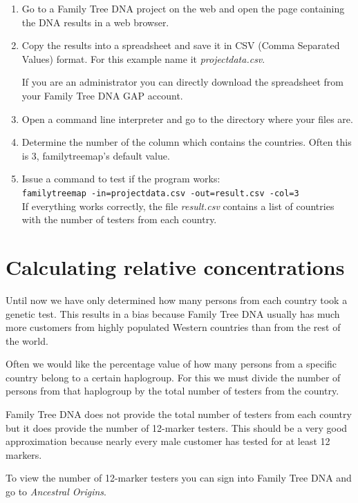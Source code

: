 \documentclass[12pt,a4paper]{article}
\begin{document}
\begin{enumerate}
\item Go to a Family Tree DNA project on the web and open the
  page containing the DNA results in a web browser.
\item Copy the results into a spreadsheet and save it in
  CSV (Comma Separated Values) format. For this example
  name it \emph{projectdata.csv}.

  If you are an administrator you can directly download the
  spreadsheet from your Family Tree DNA GAP account.

\item Open a command line interpreter and go to the
   directory where your files are.
\item Determine the number of the column which contains
  the countries. Often this is 3, familytreemap's default
  value.
\item Issue a command to test if the program works:\\
  \texttt{familytreemap -in=projectdata.csv -out=result.csv -col=3}\\
  If everything works correctly, the file \emph{result.csv}
  contains a list of countries with the number of testers
  from each country.
\end{enumerate}


\section{Calculating relative concentrations}

Until now we have only determined how many persons from each
country took a genetic test. This results in a bias because
Family Tree DNA usually has much more customers from highly
populated Western countries than from the rest of the world.

Often we would like the percentage value of how many persons
from a specific country belong to a certain haplogroup. For
this we must divide the number of persons from that haplogroup
by the total number of testers from the country.

Family Tree DNA does not provide the total number of testers
from each country but it does provide the number of 12-marker
testers. This should be a very good approximation because nearly
every male customer has tested for at least 12 markers.

To view the number of 12-marker testers you can sign into
Family Tree DNA and go to \emph{Ancestral Origins}.
\end{document}
